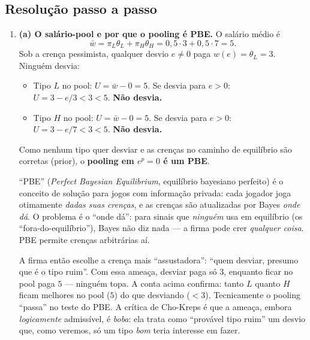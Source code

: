 \documentclass[11pt,a4paper]{article}
\newcommand{\dc}[2]{#1{,}#2}
\begin{document}
\subsection*{Resolução passo a passo}
\begin{enumerate}[leftmargin=2em,itemsep=4pt]

\item \textbf{(a) O salário-pool e por que o pooling é PBE.} O salário médio é
\[
\bar w = \pi_L\theta_L+\pi_H\theta_H = \dc{0}{5}\cdot 3 + \dc{0}{5}\cdot 7 = 5. \tag{2.1}
\]
Sob a crença pessimista, qualquer desvio $e\ne 0$ paga $w(e)=\theta_L=3$. Ninguém desvia:
\begin{itemize}[leftmargin=1.4em,itemsep=1pt,topsep=2pt]
\item Tipo $L$ no pool: $U=\bar w-0=5$. Se desvia para $e>0$: $U=3-e/3<3<5$. \textbf{Não desvia.}
\item Tipo $H$ no pool: $U=\bar w-0=5$. Se desvia para $e>0$: $U=3-e/7<3<5$. \textbf{Não desvia.}
\end{itemize}
Como nenhum tipo quer desviar e as crenças no caminho de equilíbrio são corretas (prior), o
\textbf{pooling em $e^p=0$ é um PBE}.

\begin{empalavras}
``PBE'' (\emph{Perfect Bayesian Equilibrium}, equilíbrio bayesiano perfeito) é o conceito de
solução para jogos com informação privada: cada jogador joga otimamente \emph{dadas suas
crenças}, e as crenças são atualizadas por Bayes \emph{onde dá}. O problema é o ``onde dá'':
para sinais que \emph{ninguém} usa em equilíbrio (os ``fora-do-equilíbrio''), Bayes não diz
nada — a firma pode crer \emph{qualquer coisa}. PBE permite crenças arbitrárias aí.

\smallskip\noindent
A firma então escolhe a crença mais ``assustadora'': ``quem desviar, presumo que é o tipo
ruim''. Com essa ameaça, desviar paga só $3$, enquanto ficar no pool paga $5$ — ninguém topa.
A conta acima confirma: tanto $L$ quanto $H$ ficam melhores no pool ($5$) do que desviando
($<3$). Tecnicamente o pooling ``passa'' no teste do PBE. A crítica de Cho-Kreps é que a ameaça,
embora \emph{logicamente} admissível, é \emph{boba}: ela trata como ``provável tipo ruim'' um
desvio que, como veremos, só um tipo \emph{bom} teria interesse em fazer.
\end{empalavras}


\end{enumerate}
\end{document}
